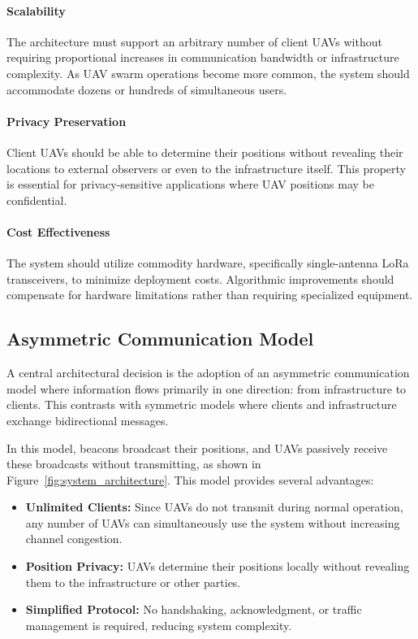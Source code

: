 \documentclass[master,final,11pt]{iscs-thesis}
\begin{document}
\paragraph{Scalability}
The architecture must support an arbitrary number of client UAVs without requiring proportional increases in communication bandwidth or infrastructure complexity.
As UAV swarm operations become more common, the system should accommodate dozens or hundreds of simultaneous users.

\paragraph{Privacy Preservation}
Client UAVs should be able to determine their positions without revealing their locations to external observers or even to the infrastructure itself.
This property is essential for privacy-sensitive applications where UAV positions may be confidential.

\paragraph{Cost Effectiveness}
The system should utilize commodity hardware, specifically single-antenna LoRa transceivers, to minimize deployment costs.
Algorithmic improvements should compensate for hardware limitations rather than requiring specialized equipment.

\subsection{Asymmetric Communication Model}

A central architectural decision is the adoption of an asymmetric communication model where information flows primarily in one direction: from infrastructure to clients.
This contrasts with symmetric models where clients and infrastructure exchange bidirectional messages.

In this model, beacons broadcast their positions, and UAVs passively receive these broadcasts without transmitting, as shown in Figure~\ref{fig:system_architecture}.
This model provides several advantages:

\begin{itemize}
    \item \textbf{Unlimited Clients:} Since UAVs do not transmit during normal operation, any number of UAVs can simultaneously use the system without increasing channel congestion.
    
    \item \textbf{Position Privacy:} UAVs determine their positions locally without revealing them to the infrastructure or other parties.
    
    \item \textbf{Simplified Protocol:} No handshaking, acknowledgment, or traffic management is required, reducing system complexity.
\end{itemize}
\end{document}
